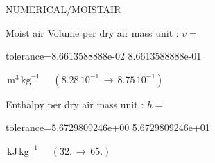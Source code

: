 \documentclass[12pt]{article}
\begin{document}
\begin{quiz}{NUMERICAL/MOISTAIR}
\begin{cloze}{Moist air}
Volume per dry air mass unit : $v =  $
\begin{numerical}[points=1] 
\item[tolerance={8.6613588888e-02}] 8.6613588888e-01 
\end{numerical} 
 $\,  \mathrm{m}^{3}\,  \mathrm{kg}^{-1}$ 
 $ \quad ( 8.28 \, 10^{-1}  \, \rightarrow \,  8.75 \, 10^{-1} ) $ 

Enthalpy per dry air mass unit : $h =  $
\begin{numerical}[points=2] 
\item[tolerance={5.6729809246e+00}] 5.6729809246e+01 
\end{numerical} 
 $\,  \mathrm{kJ}\,  \mathrm{kg}^{-1}$ 
 $ \quad (32. \, \rightarrow \, 65.) $ 

\end{cloze} 


\end{quiz}
\end{document}
